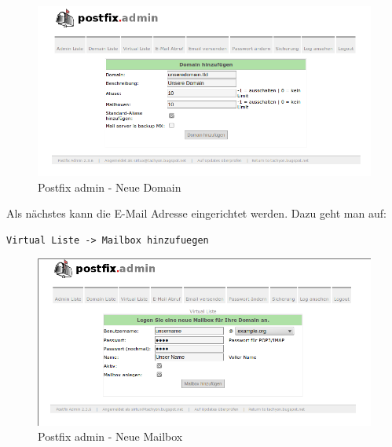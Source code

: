 \begin{figure}[h]
\centering
\includegraphics[scale=0.3]{images/pa-domain.png}
\caption{Postfix admin - Neue Domain}
\end{figure}

Als nächstes kann die E-Mail Adresse eingerichtet werden. Dazu geht man auf:

\begin{lstlisting}
Virtual Liste -> Mailbox hinzufuegen
\end{lstlisting}

\begin{figure}[h]
\centering
\includegraphics[scale=0.3]{images/pa-mail.png}
\caption{Postfix admin - Neue Mailbox}
\end{figure}

